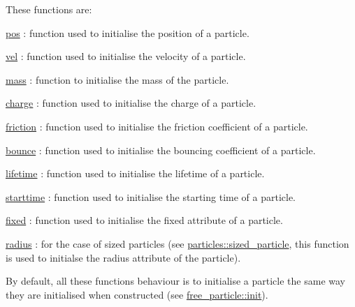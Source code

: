 These functions are\+:
\begin{DoxyItemize}
\item \hyperlink{classphysim_1_1init_1_1initialiser_a1980105ffaa655858b90a8f3a9368682}{pos} \+: function used to initialise the position of a particle.
\item \hyperlink{classphysim_1_1init_1_1initialiser_a0e6b1de60df484977b975369b225e89b}{vel} \+: function used to initialise the velocity of a particle.
\item \hyperlink{classphysim_1_1init_1_1initialiser_aaf4931c0b596b54097c43d9439d03edc}{mass} \+: function to initialise the mass of the particle.
\item \hyperlink{classphysim_1_1init_1_1initialiser_ac9ff9d82f6a1effdaf44cfacd92669d6}{charge} \+: function used to initialise the charge of a particle.
\item \hyperlink{classphysim_1_1init_1_1initialiser_a47fdfedccb1be510ee3021749dfe06e6}{friction} \+: function used to initialise the friction coefficient of a particle.
\item \hyperlink{classphysim_1_1init_1_1initialiser_ad8917d57b62f13ffb6cff24d39b4d360}{bounce} \+: function used to initialise the bouncing coefficient of a particle.
\item \hyperlink{classphysim_1_1init_1_1initialiser_ac137b5089b9beca078e08b2bcdf0d54c}{lifetime} \+: function used to initialise the lifetime of a particle.
\item \hyperlink{classphysim_1_1init_1_1initialiser_a651ed09452c1621cec2ca7f52073f53f}{starttime} \+: function used to initialise the starting time of a particle.
\item \hyperlink{classphysim_1_1init_1_1initialiser_a0deb0d7e29b824274c4cd81306b42465}{fixed} \+: function used to initialise the fixed attribute of a particle.
\item \hyperlink{classphysim_1_1init_1_1initialiser_a883682307e10c2204e0ea5ec5b217e81}{radius} \+: for the case of sized particles (see \hyperlink{classphysim_1_1particles_1_1sized__particle}{particles\+::sized\+\_\+particle}, this function is used to initialse the radius attribute of the particle).
\end{DoxyItemize}

By default, all these function\textquotesingle{}s behaviour is to initialise a particle the same way they are initialised when constructed (see \hyperlink{classphysim_1_1particles_1_1free__particle_a0df21e64a28c5fdf471d54a50b59fea3}{free\+\_\+particle\+::init}).

